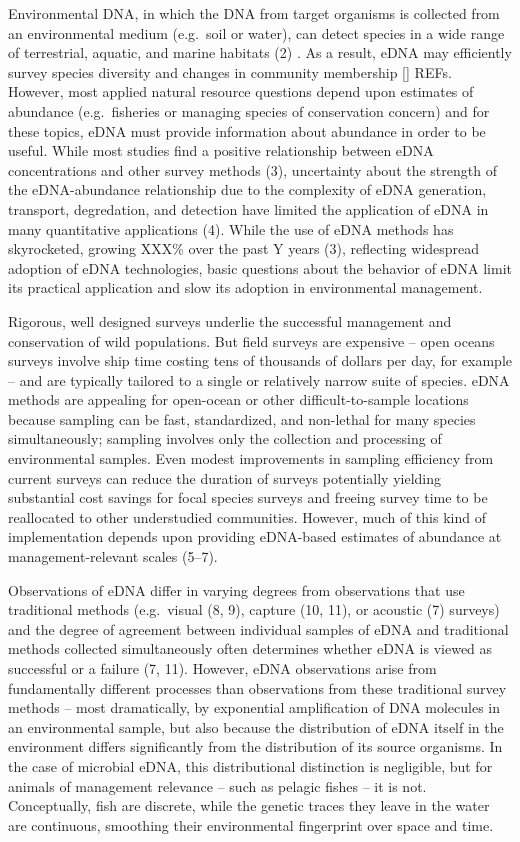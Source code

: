 \documentclass[
]{article}
\begin{document}
Environmental DNA, in which the DNA from target organisms is collected
from an environmental medium (e.g.~soil or water), can detect species in
a wide range of terrestrial, aquatic, and marine habitats (2) . As a
result, eDNA may efficiently survey species diversity and changes in
community membership {[}{]} REFs. However, most applied natural resource
questions depend upon estimates of abundance (e.g.~fisheries or managing
species of conservation concern) and for these topics, eDNA must provide
information about abundance in order to be useful. While most studies
find a positive relationship between eDNA concentrations and other
survey methods (3), uncertainty about the strength of the eDNA-abundance
relationship due to the complexity of eDNA generation, transport,
degredation, and detection have limited the application of eDNA in many
quantitative applications (4). While the use of eDNA methods has
skyrocketed, growing XXX\% over the past Y years (3), reflecting
widespread adoption of eDNA technologies, basic questions about the
behavior of eDNA limit its practical application and slow its adoption
in environmental management.

Rigorous, well designed surveys underlie the successful management and
conservation of wild populations. But field surveys are expensive --
open oceans surveys involve ship time costing tens of thousands of
dollars per day, for example -- and are typically tailored to a single
or relatively narrow suite of species. eDNA methods are appealing for
open-ocean or other difficult-to-sample locations because sampling can
be fast, standardized, and non-lethal for many species simultaneously;
sampling involves only the collection and processing of environmental
samples. Even modest improvements in sampling efficiency from current
surveys can reduce the duration of surveys potentially yielding
substantial cost savings for focal species surveys and freeing survey
time to be reallocated to other understudied communities. However, much
of this kind of implementation depends upon providing eDNA-based
estimates of abundance at management-relevant scales (5--7).

Observations of eDNA differ in varying degrees from observations that
use traditional methods (e.g.~visual (8, 9), capture (10, 11), or
acoustic (7) surveys) and the degree of agreement between individual
samples of eDNA and traditional methods collected simultaneously often
determines whether eDNA is viewed as successful or a failure (7, 11).
However, eDNA observations arise from fundamentally different processes
than observations from these traditional survey methods -- most
dramatically, by exponential amplification of DNA molecules in an
environmental sample, but also because the distribution of eDNA itself
in the environment differs significantly from the distribution of its
source organisms. In the case of microbial eDNA, this distributional
distinction is negligible, but for animals of management relevance --
such as pelagic fishes -- it is not. Conceptually, fish are discrete,
while the genetic traces they leave in the water are continuous,
smoothing their environmental fingerprint over space and time.
\end{document}
